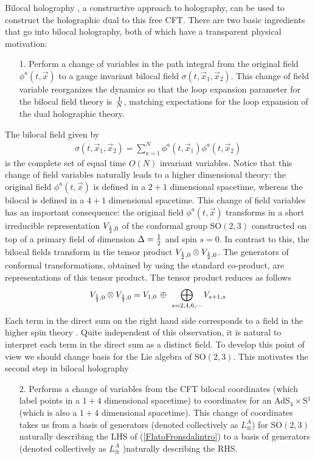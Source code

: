 \documentclass[a4paper,12pt]{article}
\def\bea{\begin{eqnarray}}
\def\eea{\end{eqnarray}}
\begin{document}
Bilocal holography \cite{Das:2003vw,Koch:2010cy,Jevicki:2011ss,Jevicki:2014mfa,Koch:2014mxa,Koch:2014aqa,deMelloKoch:2018ivk}, 
a constructive approach to holography, can be used to construct the holographic dual to this free CFT.
There are two basic ingredients that go into bilocal holography, both of which have a transparent physical motivation:
%
\begin{itemize}
\item[1.] Perform a change of variables in the path integral from the original field $\phi^a(t,\vec{x})$ to a 
gauge invariant bilocal field $\sigma(t,\vec{x}_1,\vec{x}_2)$. 
This change of field variable reorganizes the dynamics so that the loop expansion parameter for the bilocal
field theory is ${1\over N}$, matching expectations for the loop expansion of the dual holographic theory. 
\end{itemize}
%
The bilocal field given by 
%
\bea
\sigma(t,\vec{x}_1,\vec{x}_2)=\sum_{a=1}^N\phi^a(t,\vec{x}_1)\phi^a(t,\vec{x}_2) \label{bilocal}
\eea
%
is the complete set of equal time $O(N)$ invariant variables.
Notice that this change of field variables naturally leads to a higher dimensional theory: the original field $\phi^a(t,\vec{x})$
is defined in a $2+1$ dimensional spacetime, whereas the bilocal is defined in a $4+1$ dimensional spacetime.
This change of field variables has an important consequence: the original field $\phi^a(t,\vec{x})$ transforms in
a short irreducible representation $V_{{1\over 2},0}$ of the conformal group SO$(2,3)$ constructed on top of 
a primary field of dimension $\Delta ={1\over 2}$ and spin $s=0$.
In contrast to this, the bilocal fields transform in the tensor product $V_{{1\over 2},0}\otimes V_{{1\over 2},0}$.
The generators of conformal transformations, obtained by using the standard co-product, are representations of this tensor
product. The tensor product reduces as follows\cite{Flato:1978qz}
%
\begin{equation}
V_{{1\over 2},0}\otimes V_{{1\over 2},0} = V_{1,0}\,\oplus\,\,\bigoplus_{s=2,4,6,\cdots} V_{s+1,s}
\label{FlatoFronsdalintro}
\end{equation}
%
Each term in the direct sum on the right hand side corresponds to a field in the higher spin theory \cite{Vasiliev:1990en}.
Quite independent of this observation, it is natural to interpret each term in the direct sum as a distinct field.
To develop this point of view we should change basis for the Lie algebra of SO$(2,3)$.
This motivates the second step in bilocal holography
%
\begin{itemize}
\item[2.] Performs a change of variables from the CFT bilocal coordinates (which label points in a $1+4$ dimensional
spacetime) to coordinates for an AdS$_4\times$S$^1$ (which is also a $1+4$ dimensional spacetime). 
This change of coordinates takes us from a basis of generators (denoted collectively as $L_{\otimes}^A$) for SO$(2,3)$ 
naturally describing the LHS  of (\ref{FlatoFronsdalintro}) to a basis of generators (denoted collectively as $L_{\oplus}^A$
)naturally describing the RHS. 
\end{itemize}
\end{document}
